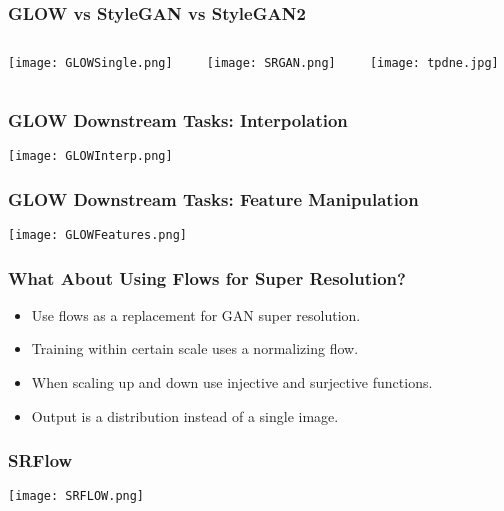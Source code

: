 \begin{frame}
    \frametitle{GLOW vs StyleGAN vs StyleGAN2}
    \begin{columns}
        \begin{column}{0.3\paperwidth}
            \center\texttt{[image: GLOWSingle.png]}
            \\
        \end{column}
        \begin{column}{0.3\paperwidth}
            \center\texttt{[image: SRGAN.png]}
            \\
        \end{column}
        \begin{column}{0.3\paperwidth}
            \center\texttt{[image: tpdne.jpg]}
            \\
        \end{column}
    \end{columns}
\end{frame}

\begin{frame}
    \frametitle{GLOW Downstream Tasks: Interpolation}
    \center\texttt{[image: GLOWInterp.png]}
\end{frame}

\begin{frame}
    \frametitle{GLOW Downstream Tasks: Feature Manipulation}
    \center\texttt{[image: GLOWFeatures.png]}
\end{frame}

\begin{frame}
    \frametitle{What About Using Flows for Super Resolution?}
    \begin{itemize}
        \item Use flows as a replacement for GAN super resolution.
        \item Training within certain scale uses a normalizing flow.
        \item When scaling up and down use injective and surjective functions.
        \item Output is a distribution instead of a single image.
    \end{itemize}
\end{frame}

\begin{frame}
    \frametitle{SRFlow}
    \center\texttt{[image: SRFLOW.png]}
\end{frame}

